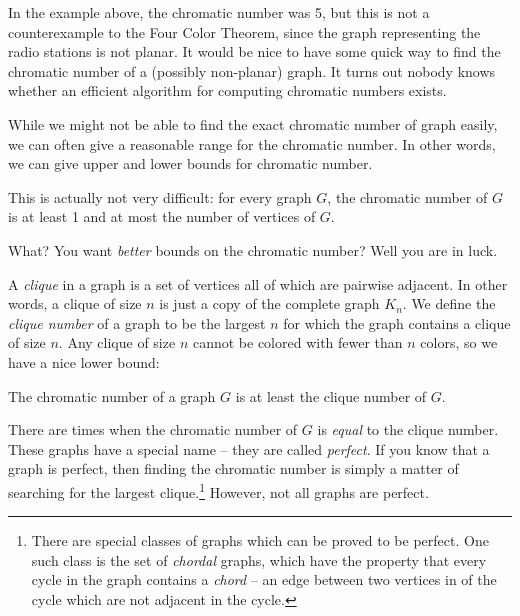 \documentclass[12pt]{article}
\begin{document}
%
%

In the example above, the chromatic number was 5, but this is not a counterexample to the Four Color Theorem, since the graph representing the radio stations is not planar.  It would be nice to have some quick way to find the chromatic number of a (possibly non-planar) graph.  It turns out nobody knows whether an efficient algorithm for computing chromatic numbers exists.

While we might not be able to find the exact chromatic number of graph easily, we can often give a reasonable range for the chromatic number.  In other words, we can give upper and lower bounds for chromatic number.

This is actually not very difficult: for every graph $G$, the chromatic number of $G$ is at least 1 and at most the number of vertices of $G$.

What?  You want \emph{better} bounds on the chromatic number?  Well you are in luck.

A \emph{clique} in a graph is a set of vertices all of which are pairwise adjacent.  In other words, a clique of size $n$ is just a copy of the complete graph $K_n$.  We define the \emph{clique number} of a graph to be the largest $n$ for which the graph contains a clique of size $n$.  Any clique of size $n$ cannot be colored with fewer than $n$ colors, so we have a nice lower bound:

\begin{theorem}
The chromatic number of a graph $G$ is at least the clique number of $G$.
\end{theorem}

There are times when the chromatic number of $G$ is \emph{equal} to the clique number.  These graphs have a special name -- they are called \emph{perfect}.  If you know that a graph is perfect, then finding the chromatic number is simply a matter of searching for the largest clique.\footnote{There are special classes of graphs which can be proved to be perfect.  One such class is the set of \emph{chordal} graphs, which have the property that every cycle in the graph contains a \emph{chord} -- an edge between two vertices in of the cycle which are not adjacent in the cycle.}  However, not all graphs are perfect.
\end{document}
